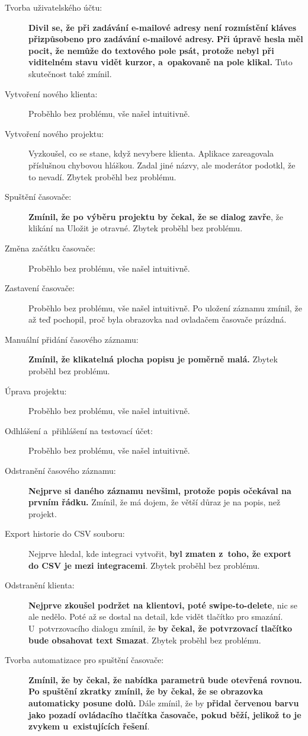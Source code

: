 \begin{description}
\item[Tvorba uživatelského účtu:] \textbf{Divil se, že při zadávání e-mailové adresy není rozmístění kláves přizpůsobeno pro zadávání e-mailové adresy.} \textbf{Při úpravě hesla měl pocit, že nemůže do textového pole psát, protože nebyl při viditelném stavu vidět kurzor, a~opakovaně na pole klikal.} Tuto skutečnost také zmínil.
\item[Vytvoření nového klienta:] Proběhlo bez problému, vše našel intuitivně.
\item[Vytvoření nového projektu:] Vyzkoušel, co se stane, když nevybere klienta. Aplikace zareagovala příslušnou chybovou hláškou. Zadal jiné názvy, ale moderátor podotkl, že to nevadí. Zbytek proběhl bez problému.
\item[Spuštění časovače:] \textbf{Zmínil, že po výběru projektu by čekal, že se dialog zavře}, že klikání na Uložit je otravné. Zbytek proběhl bez problému.
\item[Změna začátku časovače:] Proběhlo bez problému, vše našel intuitivně.
\item[Zastavení časovače:] Proběhlo bez problému, vše našel intuitivně. Po uložení záznamu zmínil, že až teď pochopil, proč byla obrazovka nad ovladačem časovače prázdná.
\item[Manuální přidání časového záznamu:] \textbf{Zmínil, že klikatelná plocha popisu je poměrně malá.} Zbytek proběhl bez problému.
\item[Úprava projektu:] Proběhlo bez problému, vše našel intuitivně.
\item[Odhlášení a~přihlášení na testovací účet:] Proběhlo bez problému, vše našel intuitivně.
\item[Odstranění časového záznamu:] \textbf{Nejprve si daného záznamu nevšiml, protože popis očekával na prvním řádku.} Zmínil, že má dojem, že větší důraz je na popis, než projekt.
\item[Export historie do CSV souboru:] Nejprve hledal, kde integraci vytvořit, \textbf{byl zmaten z~toho, že export do CSV je mezi integracemi}. Zbytek proběhl bez problému.
\item[Odstranění klienta:] \textbf{Nejprve zkoušel podržet na klientovi, poté swipe-to-delete}, nic se ale nedělo. Poté až se dostal na detail, kde vidět tlačítko pro smazání. U~potvrzovacího dialogu zmínil, že \textbf{by čekal, že potvrzovací tlačítko bude obsahovat text Smazat}. Zbytek proběhl bez problému.
\item[Tvorba automatizace pro spuštění časovače:] \textbf{Zmínil, že by čekal, že nabídka parametrů bude otevřená rovnou.} \textbf{Po spuštění zkratky zmínil, že by čekal, že se obrazovka automaticky posune dolů.} Dále zmínil, že by \textbf{přidal červenou barvu jako pozadí ovládacího tlačítka časovače, pokud běží, jelikož to je zvykem u~existujících řešení}.

\end{description}
